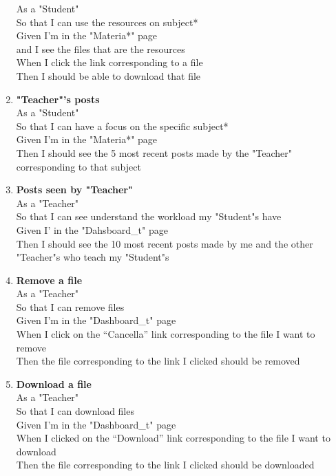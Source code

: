 \documentclass[Lau, binding=0.6cm, oneside]{sapthesis}
\begin{document}
\begin{enumerate}
			As a "Student"\\
			So that I can use the resources on subject*\\
			Given I’m in the "Materia*" page\\
			and I see the files that are the resources\\
			When I click the link corresponding to a file\\
			Then I should be able to download that file\\
	\item \textbf{"Teacher"’s posts}\\
			As a "Student"\\
			So that I can have a focus on the specific subject*\\
			Given I’m in the "Materia*" page\\
			Then I should see the 5 most recent posts made by the "Teacher" corresponding to that subject\\
	\item \textbf{Posts seen by "Teacher"}\\
			As a "Teacher"\\
			So that I can see understand the workload my "Student"s have\\
			Given I’ in the "Dahsboard\_t" page\\
			Then I should see the 10 most recent posts made by me and the other "Teacher"s who teach my "Student"s\\
	\item \textbf{Remove a file}\\
			As a "Teacher"\\
			So that I can remove files\\
			Given I’m in the "Dashboard\_t" page\\
			When I click on the “Cancella” link corresponding to the file I want to remove\\
			Then the file corresponding to the link I clicked should be removed\\
	\item \textbf{Download a file}\\
			As a "Teacher"\\
			So that I can download files\\
			Given I’m in the "Dashboard\_t" page\\
			When I clicked on the “Download” link corresponding to the file I want to download\\
			Then the file corresponding to the link I clicked should be downloaded\\

\end{enumerate}
\end{document}
